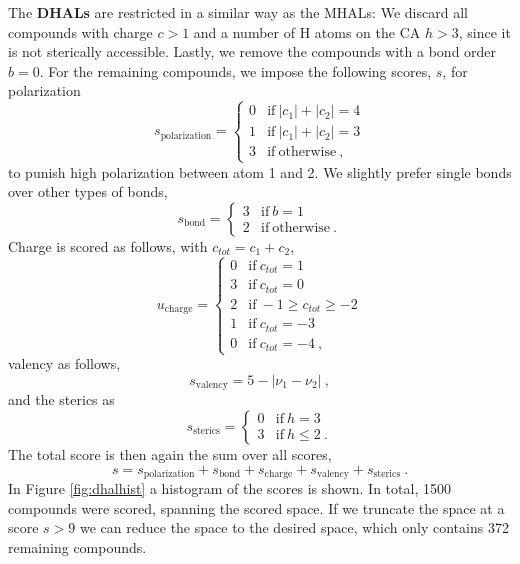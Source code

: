 \documentclass[]{article}
\begin{document}
The \textbf{DHALs} are restricted in a similar way as the MHALs: We discard all compounds with charge $c > 1$ and a number of H atoms on the CA $h > 3$, since it is not sterically accessible. Lastly, we remove the compounds with a bond order $b = 0$. For the remaining compounds, we impose the following scores, $s$, for polarization
\begin{equation}
	s_{\textrm{polarization}} = 
	\begin{cases}
	0	&	\mathrm{if}~ |c_1| + |c_2| = 4 \\
	1	&	\mathrm{if}~ |c_1| + |c_2| = 3 \\
	3   &	\mathrm{if}~ \mathrm{otherwise} ~,
	\end{cases}
\end{equation}
to punish high polarization between atom 1 and 2. We slightly prefer single bonds over other types of bonds,
\begin{equation}
	s_{\textrm{bond}} = 
	\begin{cases}
	3	&	\mathrm{if}~ b = 1 \\
	2	&	\mathrm{if}~ \textrm{otherwise} ~.
	\end{cases}
\end{equation}
Charge is scored as follows, with $c_{tot} = c_1 + c_2$,
\begin{equation}
u_{\textrm{charge}} = 
\begin{cases}
0	&	\mathrm{if}~ c_{tot} = 1 \\
3	&	\mathrm{if}~ c_{tot} = 0 \\
2   &	\mathrm{if}~ -1 \geq c_{tot} \geq -2 \\
1   &	\mathrm{if}~ c_{tot} = -3 \\
0   &	\mathrm{if}~ c_{tot} = -4 ~,
\end{cases}
\end{equation}
valency as follows,
\begin{equation}
	s_{\textrm{valency}} = 5 - |\nu_1 - \nu_2| ~,
\end{equation}
and the sterics as
\begin{equation}
	s_{\textrm{sterics}} = 
	\begin{cases}
	0	&	\mathrm{if}~ h = 3 \\
	3	&	\mathrm{if}~ h \leq 2 ~.
	\end{cases}
\end{equation}
The total score is then again the sum over all scores,
\begin{equation}
	s = s_{\textrm{polarization}} + s_{\textrm{bond}} + s_{\textrm{charge}} + s_{\textrm{valency}} + s_{\textrm{sterics}} ~.
\end{equation}
In Figure \ref{fig:dhalhist} a histogram of the scores is shown. In total, 1500 compounds were scored, spanning the scored space. If we truncate the space at a score $s > 9$ we can reduce the space to the desired space, which only contains 372 remaining compounds. 
\end{document}
